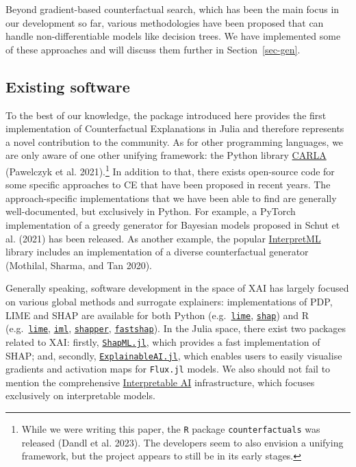 \documentclass{juliacon}
\begin{document}
Beyond gradient-based counterfactual search, which has been the main
focus in our development so far, various methodologies have been
proposed that can handle non-differentiable models like decision trees.
We have implemented some of these approaches and will discuss them
further in Section~\ref{sec-gen}.

\subsection{Existing software}\label{existing-software}

To the best of our knowledge, the package introduced here provides the
first implementation of Counterfactual Explanations in Julia and
therefore represents a novel contribution to the community. As for other
programming languages, we are only aware of one other unifying
framework: the Python library
\href{https://carla-counterfactual-and-recourse-library.readthedocs.io/en/latest/?badge=latest}{CARLA}
(Pawelczyk et al. 2021).\footnote{While we were writing this paper, the
  \texttt{R} package \texttt{counterfactuals} was released (Dandl et al.
  2023). The developers seem to also envision a unifying framework, but
  the project appears to still be in its early stages.} In addition to
that, there exists open-source code for some specific approaches to CE
that have been proposed in recent years. The approach-specific
implementations that we have been able to find are generally
well-documented, but exclusively in Python. For example, a PyTorch
implementation of a greedy generator for Bayesian models proposed in
Schut et al. (2021) has been released. As another example, the popular
\href{https://github.com/interpretml}{InterpretML} library includes an
implementation of a diverse counterfactual generator (Mothilal, Sharma,
and Tan 2020).

Generally speaking, software development in the space of XAI has largely
focused on various global methods and surrogate explainers:
implementations of PDP, LIME and SHAP are available for both Python
(e.g.~\href{https://github.com/marcotcr/lime}{\texttt{lime}},
\href{https://github.com/slundberg/shap}{\texttt{shap}}) and R
(e.g.~\href{https://cran.r-project.org/web/packages/lime/index.html}{\texttt{lime}},
\href{https://cran.r-project.org/web/packages/lime/index.html}{\texttt{iml}},
\href{https://modeloriented.github.io/shapper/}{\texttt{shapper}},
\href{https://github.com/bgreenwell/fastshap}{\texttt{fastshap}}). In
the Julia space, there exist two packages related to XAI: firstly,
\href{https://github.com/nredell/ShapML.jl}{\texttt{ShapML.jl}}, which
provides a fast implementation of SHAP; and, secondly,
\href{https://github.com/adrhill/ExplainableAI.jl}{\texttt{ExplainableAI.jl}},
which enables users to easily visualise gradients and activation maps
for \texttt{Flux.jl} models. We also should not fail to mention the
comprehensive
\href{https://docs.interpretable.ai/stable/IAIBase/data/}{Interpretable
AI} infrastructure, which focuses exclusively on interpretable models.
\end{document}

